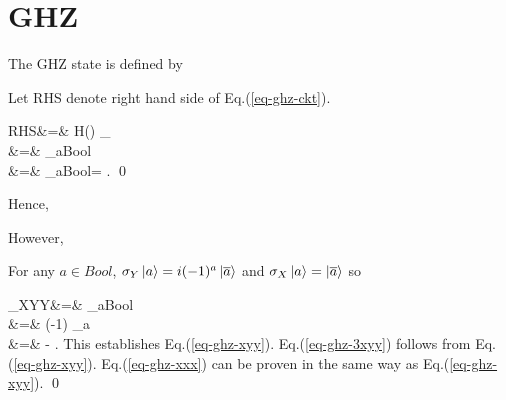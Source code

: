 \chapter{GHZ}

The GHZ state is defined by


\claim

\proof
Let RHS denote right
hand side of Eq.(\ref{eq-ghz-ckt}).

\beqa
RHS&=&
\cnot{\bitc}{\bita}
\cnot{\bitc}{\bitb}
H(\bitc)
_{\bita\bitb\bitc}
\\
&=&
\cnot{\bitc}{\bita}
\cnot{\bitc}{\bitb}
\sum_{a\in Bool}
\\
&=&
\sum_{a\in Bool}=
\;.
\eeqa
\qed

\claim

Hence,

However,

\proof
For any $a\in Bool$,
${\sigma_Y}\left\vert{a}\right\rangle=i(-1)^a\left\vert{\overline{a}}\right\rangle$ and
${\sigma_X}\left\vert{a}\right\rangle=\left\vert{\overline{a}}\right\rangle$ so

\beqa
\sigma_{XYY}&=&
\sigx\otimes\sigy\otimes\sigy
{}\sum_{a\in Bool}
\\
&=&
(-1)
\sum_a\\
&=& -
\;.
\eeqa
This establishes Eq.(\ref{eq-ghz-xyy}).
Eq.(\ref{eq-ghz-3xyy}) follows from
Eq.(\ref{eq-ghz-xyy}).
Eq.(\ref{eq-ghz-xxx}) can be proven in the
same way as Eq.(\ref{eq-ghz-xyy}).
\qed
